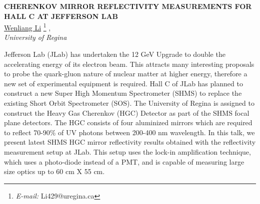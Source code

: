 \documentclass{article}
\newcommand{\Title}[1]{{\Large\bfseries\boldmath\uppercase{#1}}}
\newcommand{\presentingauthor}[1]{{\large\underline{#1}}}
\newcommand{\institution}[1]{{\large\emph{#1}}}
\begin{document}
\begin{center}
\Large
\Title{Cherenkov Mirror Reflectivity Measurements for Hall C at Jefferson  Lab}%
      \\[4mm]
\large
\presentingauthor{Wenliang Li}%
      {\footnote{\emph{E-mail:} Li429@uregina.ca}}%
      , %
%
\\[1mm]
\institution{University of Regina}
\\[3mm]
\end{center}

Jefferson Lab (JLab) has undertaken the 12 GeV Upgrade to double the accelerating energy of its electron beam. This attracts many interesting proposals to probe the quark-gluon nature of nuclear matter at higher energy, therefore a new set of experimental equipment is required. Hall C of JLab has planned to construct a new Super High Momentum Spectrometer (SHMS) to replace the existing Short Orbit Spectrometer (SOS). The University of Regina is assigned to construct the Heavy Gas Cherenkov (HGC) Detector as part of the SHMS focal plane detectors. The HGC consists of four aluminized mirrors which are required to reflect 70-90\% of UV photons between 200-400 nm wavelength. In this talk, we present latest SHMS HGC mirror reflectivity results obtained with the reflectivity measurement setup at JLab. This setup uses the lock-in amplification technique, which uses a photo-diode instead of a PMT, and is capable of measuring large size optics up to 60 cm X 55 cm.
\end{document}
